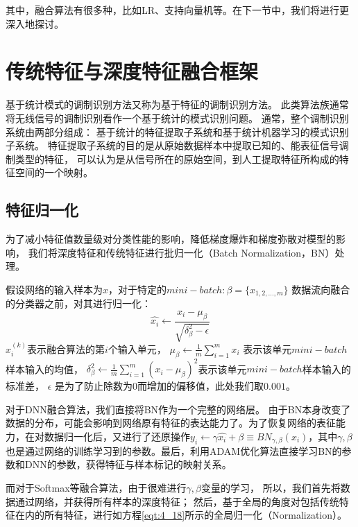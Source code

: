 其中，融合算法有很多种，比如LR、支持向量机等。在下一节中，我们将进行更深入地探讨。


\section{传统特征与深度特征融合框架}

基于统计模式的调制识别方法又称为基于特征的调制识别方法。
此类算法族通常将无线信号的调制识别看作一个基于统计的模式识别问题。
通常，整个调制识别系统由两部分组成：
基于统计的特征提取子系统和基于统计机器学习的模式识别子系统。
特征提取子系统的目的是从原始数据样本中提取已知的、能表征信号调制类型的特征，
可以认为是从信号所在的原始空间，到人工提取特征所构成的特征空间的一个映射。\par

\subsection{特征归一化}
\label{sec:feature_normalization}
为了减小特征值数量级对分类性能的影响，降低梯度爆炸和梯度弥散对模型的影响，
我们将深度特征和传统特征进行批归一化（Batch Normalization，BN）处理。\par

假设网络的输入样本为$x$，对于特定的$mini-batch: \beta=\{x_{1,2,...,m}\}$
数据流向融合的分类器之前，对其进行归一化：
\begin{equation}
	\label{eqt:4_18}
	\hat{x_i} \leftarrow \frac{x_i - \mu_\beta}{\sqrt{\delta_\beta^2 - \epsilon}}
\end{equation}
$x_i^{(k)}$表示融合算法的第$i$个输入单元，
$\mu_\beta \leftarrow \frac{1}{m}\sum_{i=1}^{m} x_i$ 表示该单元$mini-batch$样本输入的均值，
$	\delta_\beta^2 \leftarrow \frac{1}{m}\sum_{i=1}^{m}(x_i - \mu_\beta)^2$表示该单元$mini-batch$样本输入的标准差，
$\epsilon$ 是为了防止除数为$0$而增加的偏移值，此处我们取$0.001$。\par

对于DNN融合算法，我们直接将BN作为一个完整的网络层。
由于BN本身改变了数据的分布，可能会影响到网络原有特征的表达能力了。为了恢复网络的表征能力，在对数据归一化后，又进行了还原操作$y_i \leftarrow \gamma \hat{x_i} + \beta \equiv BN_{\gamma, \beta}(x_i)$，其中$\gamma, \beta$也是通过网络的训练学习到的参数。最后，利用ADAM优化算法直接学习BN的参数和DNN的参数，获得特征与样本标记的映射关系。\par

而对于Softmax等融合算法，由于很难进行$\gamma, \beta$变量的学习，
所以，我们首先将数据通过网络，并获得所有样本的深度特征；
然后，基于全局的角度对包括传统特征在内的所有特征，进行如方程\eqref{eqt:4_18}所示的全局归一化（Normalization）。\par

